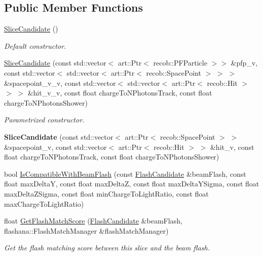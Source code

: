 \subsection*{Public Member Functions}
\begin{DoxyCompactItemize}
\item 
\hyperlink{classflashmatch_1_1FlashMatchingTool_1_1SliceCandidate_ae2d99f84ab9976ff1880906fa46427c2}{Slice\+Candidate} ()\hypertarget{classflashmatch_1_1FlashMatchingTool_1_1SliceCandidate_ae2d99f84ab9976ff1880906fa46427c2}{}\label{classflashmatch_1_1FlashMatchingTool_1_1SliceCandidate_ae2d99f84ab9976ff1880906fa46427c2}

\begin{DoxyCompactList}\small\item\em Default constructor. \end{DoxyCompactList}\item 
\hyperlink{classflashmatch_1_1FlashMatchingTool_1_1SliceCandidate_a5087a8ac4efb368f39643468585f7591}{Slice\+Candidate} (const std\+::vector$<$ art\+::\+Ptr$<$ recob\+::\+P\+F\+Particle $>$$>$ \&pfp\+\_\+v, const std\+::vector$<$ std\+::vector$<$ art\+::\+Ptr$<$ recob\+::\+Space\+Point $>$ $>$ $>$ \&spacepoint\+\_\+v\+\_\+v, const std\+::vector$<$ std\+::vector$<$ art\+::\+Ptr$<$ recob\+::\+Hit $>$ $>$ $>$ \&hit\+\_\+v\+\_\+v, const float charge\+To\+N\+Photons\+Track, const float charge\+To\+N\+Photons\+Shower)
\begin{DoxyCompactList}\small\item\em Parametrized constructor. \end{DoxyCompactList}\item 
{\bfseries Slice\+Candidate} (const std\+::vector$<$ art\+::\+Ptr$<$ recob\+::\+Space\+Point $>$ $>$ \&spacepoint\+\_\+v, const std\+::vector$<$ art\+::\+Ptr$<$ recob\+::\+Hit $>$ $>$ \&hit\+\_\+v, const float charge\+To\+N\+Photons\+Track, const float charge\+To\+N\+Photons\+Shower)\hypertarget{classflashmatch_1_1FlashMatchingTool_1_1SliceCandidate_a9ba86dbafd572849c898422aee9dddda}{}\label{classflashmatch_1_1FlashMatchingTool_1_1SliceCandidate_a9ba86dbafd572849c898422aee9dddda}

\item 
bool \hyperlink{classflashmatch_1_1FlashMatchingTool_1_1SliceCandidate_ac39549da77f9d1d2fef87dd31a01e09a}{Is\+Compatible\+With\+Beam\+Flash} (const \hyperlink{classflashmatch_1_1FlashMatchingTool_1_1FlashCandidate}{Flash\+Candidate} \&beam\+Flash, const float max\+DeltaY, const float max\+DeltaZ, const float max\+Delta\+Y\+Sigma, const float max\+Delta\+Z\+Sigma, const float min\+Charge\+To\+Light\+Ratio, const float max\+Charge\+To\+Light\+Ratio)
\item 
float \hyperlink{classflashmatch_1_1FlashMatchingTool_1_1SliceCandidate_a7c1f2eedf7f2fc763cd7d738a5ac32af}{Get\+Flash\+Match\+Score} (\hyperlink{classflashmatch_1_1FlashMatchingTool_1_1FlashCandidate}{Flash\+Candidate} \&beam\+Flash, flashana\+::\+Flash\+Match\+Manager \&flash\+Match\+Manager)
\begin{DoxyCompactList}\small\item\em Get the flash matching score between this slice and the beam flash. \end{DoxyCompactList}\end{DoxyCompactItemize}
